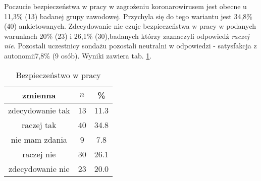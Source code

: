 

Poczucie bezpieczeństwa w pracy w zagrożeniu koronarowirusem jest obecne u 11,3\% (13) badanej grupy zawodowej. Przychyla się do tego wariantu jest 34,8\% (40) ankietowanych.  Zdecydowanie nie czuje bezpieczeństwa w pracy w podanych warunkach 20\% (23) i 26,1\% (30),badanych którzy zaznaczyli odpowiedź \textit{raczej nie}. Pozostali uczestnicy sondażu pozostali neutralni w odpowiedzi -   satysfakcja z autonomii7,8\% (9 osób). Wyniki zawiera tab. \ref{tab:Q18}.

\begin{table}[H]
\caption{Bezpieczeństwo w pracy}
\centering
\begin{tabular}{ | c | c | c |}
\hline
zmienna & $n$ & \% \\
\hline
zdecydowanie tak  &  13  & 11.3\\
\hline
raczej tak  &  40  & 34.8\\
\hline
nie mam zdania  &  9  & 7.8 \\
\hline
raczej nie  &  30  & 26.1 \\
\hline
zdecydowanie nie  &  23  & 20.0 \\
\hline
\end{tabular}
\label{tab:Q18}
\end{table}

